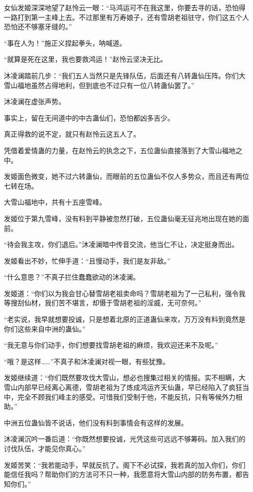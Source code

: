 \begin{this_body}
女仙发姬深深地望了赵怜云一眼：“马鸿运可不在我这里，你要去寻的话，恐怕得一路打到第一主峰上去。不过那里有万寿娘子，还有雪胡老祖驻守，你们这五个人恐怕还不够塞牙缝的。”

“事在人为！”施正义捏起拳头，呐喊道。

“就算是死在这里，我也要救鸿运！”赵怜云坚决无比。

沐凌澜踏前几步：“我们五人当然只是先锋队伍，后面还有八转蛊仙压阵。你们大雪山福地虽然占得地利，但到底也不过只有一位八转蛊仙罢了。”

沐凌澜在虚张声势。

事实上，留在无间道中的中古蛊仙们，恐怕都凶多吉少。

真正得救的说不定，就只有赵怜云这五人了。

凭借着爱情蛊的力量，在赵怜云的执念之下，五位蛊仙直接落到了大雪山福地之中。

发姬面色微变，她不过六转蛊仙，而眼前的五位蛊仙不仅人多势众，而且还有两位七转在场。

大雪山福地中，共有十五座雪峰。

发姬位于第九雪峰，没有料到平静被忽然打破，五位蛊仙毫无征兆地出现在她的面前。

“待会我主攻，你们退后。”沐凌澜暗中传音交流，他当仁不让，决定挺身而出。

发姬看出不妙，忙伸手道：“且慢动手，我们是友非敌。”

“什么意思？”不真子拦住蠢蠢欲动的沐凌澜。

发姬道：“你们以为我会甘心替雪胡老祖卖命吗？雪胡老祖为了一己私利，强令我等搜刮仙材，我们苦不堪言，却慑于雪胡老祖的淫威，无可奈何。”

“老实说，我早就想要投诚，只是想着北原的正道蛊仙来攻，万万没有料到竟然是你们这些来自中洲的蛊仙。”

“我无意与你们动手，你们想要找雪胡老祖的麻烦，我欢迎还来不及呢。”

“哦？是这样……”不真子和沐凌澜对视一眼，有些犹豫。

发姬继续道：“你们既然要攻伐大雪山，想必也搜集过相关的情报。实不相瞒，大雪山内部早已经离心离德，雪胡老祖为了炼成鸿运齐天仙蛊，早已经陷入了疯狂当中，完全不顾我们峰主的感受。可惜我们受制于他，不能反抗，只有等候外力相助。”

中洲五位蛊仙皆不说话，他们没有料到事情会有这样的发展。

沐凌澜沉吟一番后道：“你既然想要投诚，光凭这些可远远不够筹码。加入我们的讨伐队伍，才能见你真心。”

发姬苦笑：“我若能动手，早就反抗了。阁下不必试探，我若真的加入你们，你们能信任我吗？帮助你们的方法可不只一种，我愿意将大雪山内部的防务布置，都告知你们。”


\end{this_body}
